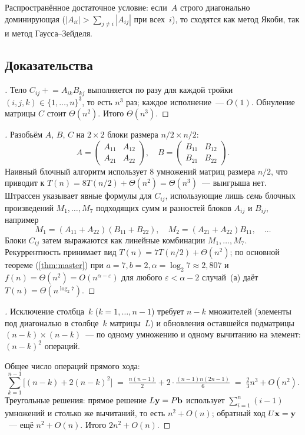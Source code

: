 Распространённое достаточное условие: если~$A$ строго диагонально
доминирующая ($|A_{ii}| > \sum_{j \neq i} |A_{ij}|$ при всех~$i$), то
сходятся как метод Якоби, так и метод Гаусса--Зейделя.

\subsection*{Доказательства}

\begin{proof}[]
Тело $C_{ij} \mathrel{+}= A_{ik} B_{kj}$ выполняется по разу для
каждой тройки $(i, j, k) \in \{1, \dots, n\}^3$, то есть $n^3$ раз;
каждое исполнение~--- $O(1)$. Обнуление матрицы $C$ стоит
$\Theta(n^2)$. Итого $\Theta(n^3)$.
\end{proof}

\begin{proof}[]
Разобьём $A$, $B$, $C$ на $2 \times 2$ блоки размера
$n/2 \times n/2$:
\[
  A = \begin{pmatrix} A_{11} & A_{12} \\ A_{21} & A_{22} \end{pmatrix},\quad
  B = \begin{pmatrix} B_{11} & B_{12} \\ B_{21} & B_{22} \end{pmatrix}.
\]
Наивный блочный алгоритм использует $8$ умножений матриц размера
$n/2$, что приводит к $T(n) = 8 T(n/2) + \Theta(n^2) = \Theta(n^3)$~---
выигрыша нет. Штрассен указывает явные формулы для $C_{ij}$,
использующие лишь \emph{семь} блочных произведений
$M_1, \dots, M_7$ подходящих сумм и разностей блоков $A_{ij}$ и $B_{ij}$,
например
\[
  M_1 = (A_{11} + A_{22})(B_{11} + B_{22}),\quad
  M_2 = (A_{21} + A_{22}) B_{11},\quad \dots
\]
Блоки $C_{ij}$ затем выражаются как линейные комбинации
$M_1, \dots, M_7$. Рекуррентность принимает вид
$T(n) = 7 T(n/2) + \Theta(n^2)$; по основной теореме
(\cref{thm:master}) при $a = 7, b = 2, \alpha = \log_2 7 \approx 2{,}807$
и $f(n) = \Theta(n^2) = O(n^{\alpha - \varepsilon})$ для любого
$\varepsilon < \alpha - 2$ случай~(а) даёт
$T(n) = \Theta(n^{\log_2 7})$.
\end{proof}

\begin{proof}[]
Исключение столбца~$k$ ($k = 1, \dots, n - 1$) требует $n - k$
множителей (элементы под диагональю в столбце~$k$ матрицы~$L$) и
обновления оставшейся подматрицы $(n - k) \times (n - k)$~--- по
одному умножению и одному вычитанию на элемент: $(n - k)^2$ операций.

Общее число операций прямого хода:
\[
  \sum_{k=1}^{n-1} \bigl[(n - k) + 2 (n - k)^2\bigr]
  \;=\; \tfrac{n(n - 1)}{2} + 2 \cdot \tfrac{(n - 1) n (2n - 1)}{6}
  \;=\; \tfrac{2}{3} n^3 + O(n^2).
\]
Треугольные решения: прямое решение $L \mathbf{y} = P \mathbf{b}$
использует $\sum_{i=1}^{n} (i - 1)$ умножений и столько же вычитаний,
то есть $n^2 + O(n)$; обратный ход $U \mathbf{x} = \mathbf{y}$~--- ещё
$n^2 + O(n)$. Итого $2 n^2 + O(n)$.
\end{proof}

